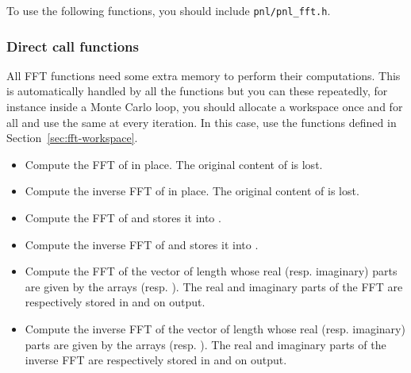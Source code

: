 To use the following functions, you should include \verb!pnl/pnl_fft.h!.

\subsubsection{Direct call functions}
All FFT functions need some extra memory to perform their computations. This is automatically handled by all the functions but you can these repeatedly, for instance inside a Monte Carlo loop, you should allocate a workspace once and for all and use the same at every iteration. In this case, use the functions defined in Section~\ref{sec:fft-workspace}.

\begin{itemize}
\item {}
  \sshortdescribe Compute the FFT of  in place. The original content
  of  is lost.

\item {}
  \sshortdescribe Compute the inverse FFT of  in place. The
  original content of  is lost.

\item {}
  \sshortdescribe Compute the FFT of  and stores it into .

\item {}
  \sshortdescribe Compute the inverse FFT of  and stores it into .

\item {}
  \sshortdescribe Compute the FFT of the vector of length  whose real
  (resp. imaginary) parts are given by the arrays 
  (resp. ). The real and imaginary parts of the FFT are respectively
  stored in  and  on output.

\item {}
  \sshortdescribe Compute the inverse FFT of the vector of length 
  whose real (resp. imaginary) parts are given by the arrays 
  (resp. ). The real and imaginary parts of the inverse FFT are
  respectively stored in  and  on output.


\end{itemize}
